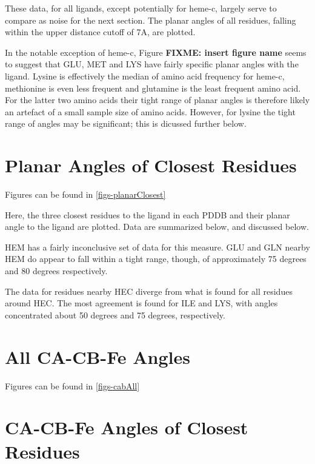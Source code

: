 \documentclass[a4paper, nobind]{templates/ociamthesis}
\begin{document}
These data, for all ligands, except potentially for heme-c, largely serve to compare as noise for the next section. The planar angles of all residues, falling within the upper distance cutoff of 7A, are plotted.

In the notable exception of heme-c, Figure \textbf{FIXME: insert figure name} seems to suggest that GLU, MET and LYS have fairly specific planar angles with the ligand. Lysine is effectively the median of amino acid frequency for heme-c, methionine is even less frequent and glutamine is the least frequent amino acid. For the latter two amino acids their tight range of planar angles is therefore likely an artefact of a small sample size of amino acids. However, for lysine the tight range of angles may be significant; this is dicussed further below.

\hypertarget{planar-angles-of-closest-residues}{%
\section{Planar Angles of Closest Residues}\label{planar-angles-of-closest-residues}}

Figures can be found in \ref{figs-planarClosest}

Here, the three closest residues to the ligand in each PDDB and their planar angle to the ligand are plotted. Data are summarized below, and discussed below.

HEM has a fairly inconclusive set of data for this measure. GLU and GLN nearby HEM do appear to fall within a tight range, though, of approximately 75 degrees and 80 degrees respectively.

The data for residues nearby HEC diverge from what is found for all residues around HEC. The most agreement is found for ILE and LYS, with angles concentrated about 50 degrees and 75 degrees, respectively.

\hypertarget{all-ca-cb-fe-angles}{%
\section{All CA-CB-Fe Angles}\label{all-ca-cb-fe-angles}}

Figures can be found in \ref{figs-cabAll}

\hypertarget{ca-cb-fe-angles-of-closest-residues}{%
\section{CA-CB-Fe Angles of Closest Residues}\label{ca-cb-fe-angles-of-closest-residues}}
\end{document}
